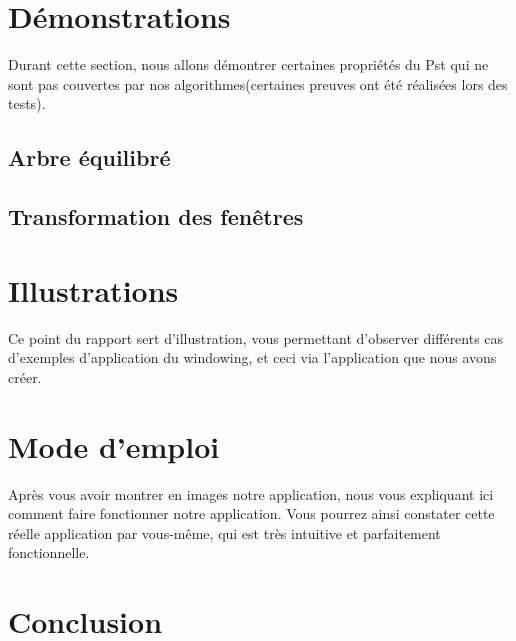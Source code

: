 \documentclass[10pt,a4paper]{article}
\begin{document}
\section{Démonstrations}
Durant cette section, nous allons démontrer certaines propriétés du Pst qui ne sont pas couvertes par nos algorithmes(certaines preuves ont été réalisées lors des tests).
\subsection{Arbre équilibré}

\subsection{Transformation des fenêtres}

\section{Illustrations}
Ce point du rapport sert d'illustration, vous permettant d'observer différents cas d'exemples d'application du windowing, et ceci via l'application que nous avons créer.

\section{Mode d'emploi}
Après vous avoir montrer en images notre application, nous vous expliquant ici comment faire fonctionner notre application. Vous pourrez ainsi constater cette réelle application par vous-même, qui est très intuitive et parfaitement fonctionnelle.

\section{Conclusion}
\end{document}
